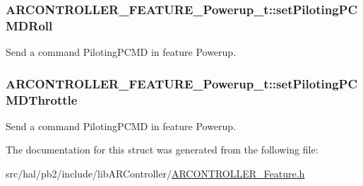 \subsubsection[{\texorpdfstring{set\+Piloting\+P\+C\+M\+D\+Roll}{setPilotingPCMDRoll}}]{ A\+R\+C\+O\+N\+T\+R\+O\+L\+L\+E\+R\+\_\+\+F\+E\+A\+T\+U\+R\+E\+\_\+\+Powerup\+\_\+t\+::set\+Piloting\+P\+C\+M\+D\+Roll}\hypertarget{struct_a_r_c_o_n_t_r_o_l_l_e_r___f_e_a_t_u_r_e___powerup__t_af99ae95e66e73c6d0dcde2c16a310c57}{}\label{struct_a_r_c_o_n_t_r_o_l_l_e_r___f_e_a_t_u_r_e___powerup__t_af99ae95e66e73c6d0dcde2c16a310c57}
Send a command {\ttfamily Piloting\+P\+C\+MD} in feature {\ttfamily Powerup}. 
\subsubsection[{\texorpdfstring{set\+Piloting\+P\+C\+M\+D\+Throttle}{setPilotingPCMDThrottle}}]{ A\+R\+C\+O\+N\+T\+R\+O\+L\+L\+E\+R\+\_\+\+F\+E\+A\+T\+U\+R\+E\+\_\+\+Powerup\+\_\+t\+::set\+Piloting\+P\+C\+M\+D\+Throttle}\hypertarget{struct_a_r_c_o_n_t_r_o_l_l_e_r___f_e_a_t_u_r_e___powerup__t_aa9a3c347fab0b956d79fb6d1629b2529}{}\label{struct_a_r_c_o_n_t_r_o_l_l_e_r___f_e_a_t_u_r_e___powerup__t_aa9a3c347fab0b956d79fb6d1629b2529}
Send a command {\ttfamily Piloting\+P\+C\+MD} in feature {\ttfamily Powerup}. 

The documentation for this struct was generated from the following file\+:\begin{DoxyCompactItemize}
\item 
src/hal/pb2/include/lib\+A\+R\+Controller/\hyperlink{_a_r_c_o_n_t_r_o_l_l_e_r___feature_8h}{A\+R\+C\+O\+N\+T\+R\+O\+L\+L\+E\+R\+\_\+\+Feature.\+h}\end{DoxyCompactItemize}
